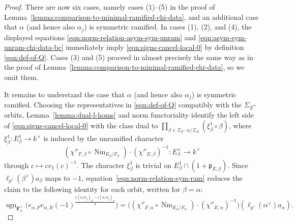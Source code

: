 \documentclass[reqno]{amsart}
\numberwithin{equation}{subsection}
\newcommand{\F}{\mathbf{F}}
\newcommand{\sgn}{\operatorname{sgn}}
\newcommand{\co}{\colon}
\newcommand\frp{\mathfrak{p}}
\DeclareMathOperator{\Nm}{Nm}
\theoremstyle{remark}
\numberwithin{equation}{subsection}
\numberwithin{figure}{subsection}
\begin{document}
\begin{proof}
There are now six cases, namely cases (1)--(5) in the proof of Lemma~\ref{lemma:comparison-to-minimal-ramified-chi-data}, and an additional case that $\alpha$ (and hence also $\alpha_j$) is symmetric ramified.
In cases (1), (2), and (4), the displayed equations \eqref{eqn:norm-relation-asym-sym-unram} and \eqref{eqn:asym-sym-unram-chi-data-bc} immediately imply \eqref{eqn:signs-cancel-local-0} by definition \eqref{eqn:def-of-Q}. Cases (3) and (5) proceed in almost precisely the same way as in the proof of Lemma~\ref{lemma:comparison-to-minimal-ramified-chi-data}, so we omit them.

It remains to understand the case that $\alpha$ (and hence also $\alpha_j$) is symmetric ramified. Choosing the representatives in \eqref{eqn:def-of-Q} compatibly with the $\Sigma_E$-orbits, Lemma~\ref{lemma:dual-l-homs} and norm functoriality identify the left side of \eqref{eqn:signs-cancel-local-0} with the class dual to $\prod_{\beta\in\Sigma_F\cdot\alpha/\Sigma_E}(\xi_\beta^1\circ\beta)$, where $\xi_\beta^1\co E_\beta^1\to k^\times$ is induced by the unramified character
\begin{equation}\label{eqn:char-dual-to-q-bc}
(\chi''_{F,\beta}\circ\Nm_{E_\beta/F_\beta})\cdot(\chi''_{E,\beta})^{-1}\co E_\beta^\times\to k^\times
\end{equation}
through $c\mapsto c v_1(c)^{-1}$. The character $\xi_\beta^1$ is trivial on $E_\beta^1\cap(1+\frp_{E,\beta})$. Since $\ell_{p'}(\beta^\vee)a_\beta$ maps to $-1$, equation~\eqref{eqn:norm-relation-sym-ram} reduces the claim to the following identity for each orbit, written for $\beta=\alpha$:
\begin{equation}\label{eqn:eps-vs-chi-bc}
\sgn_{\F_\alpha^\times}\bigl(e_{\alpha,F}e_{\alpha,E}(-1)^{\frac{e(\alpha/\alpha_j)_E-e(\alpha/\alpha_j)_F}{2}}\bigr)
=\bigl((\chi''_{F,\alpha}\circ\Nm_{E_\alpha/F_\alpha})\cdot(\chi''_{E,\alpha})^{-1}\bigr)(\ell_{p'}(\alpha^\vee)a_\alpha).
\end{equation}


\end{proof}
\end{document}
